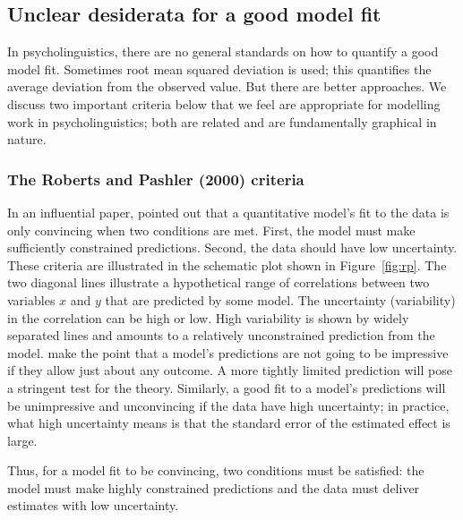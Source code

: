 \documentclass{cambridge7A}\usepackage[]{graphicx}\usepackage[]{color}
\begin{document}
\subsection{Unclear desiderata for a good model fit}

In psycholinguistics, there are no general standards on how to
quantify a good model fit. Sometimes root mean squared
deviation is used; this quantifies the average deviation from the observed
value. But there are better approaches. We discuss two important
criteria below that we feel are appropriate for modelling work in
psycholinguistics; both are related and are
fundamentally graphical in nature.

\subsubsection{The Roberts and Pashler (2000) criteria}

In an influential paper, \cite{rp} pointed out that a quantitative
model's fit to the data is only convincing when two conditions are
met. First, the model must make sufficiently constrained
predictions. Second, the data should have low uncertainty. These
criteria are illustrated in the schematic plot shown in
Figure~\ref{fig:rp}. The two diagonal lines illustrate a hypothetical
range of correlations between two variables $x$ and $y$ that are
predicted by some model. The uncertainty (variability) in the 
correlation can be high or low. High variability is shown by widely
separated lines and amounts to a relatively unconstrained prediction
from the model. \cite{rp} make the point that a model's predictions
are not going to be impressive if they allow just about any outcome. A
more tightly limited prediction will pose a stringent test for the
theory.  Similarly, a good fit to a
model's predictions will be unimpressive and unconvincing if the data have
high uncertainty; in practice, what high uncertainty means is that 
the standard error of the estimated effect is large.

Thus, for a model fit to be convincing, two conditions must be
satisfied: the model must make highly constrained predictions and the
data must deliver estimates with low uncertainty.
\end{document}
